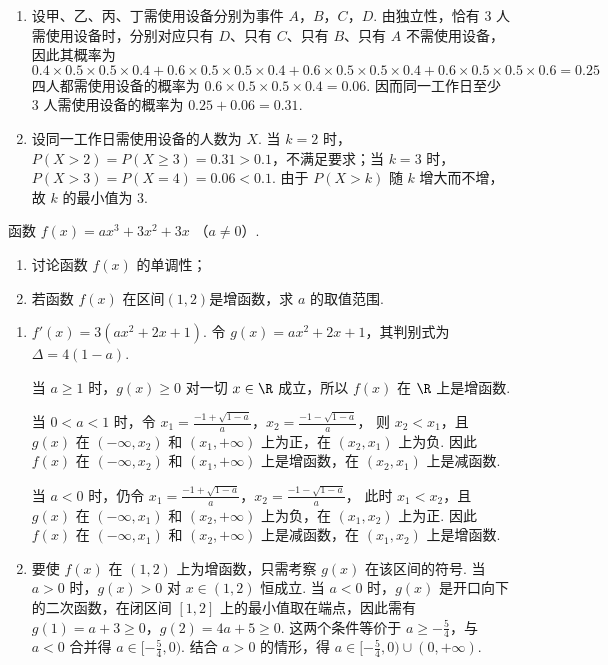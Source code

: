 \begin{solution}
\begin{enumerate}
\item 设甲、乙、丙、丁需使用设备分别为事件 \(A\)，\(B\)，\(C\)，\(D\). 由独立性，恰有 \(3\) 人需使用设备时，分别对应只有 \(D\)、只有 \(C\)、只有 \(B\)、只有 \(A\) 不需使用设备，因此其概率为
\[
0.4\times0.5\times0.5\times0.4
+0.6\times0.5\times0.5\times0.4
+0.6\times0.5\times0.5\times0.4
+0.6\times0.5\times0.5\times0.6
=0.25
\]
四人都需使用设备的概率为
\(0.6\times0.5\times0.5\times0.4=0.06\). 因而同一工作日至少 \(3\) 人需使用设备的概率为 \(0.25+0.06=0.31\).
\item 设同一工作日需使用设备的人数为 \(X\). 当 \(k=2\) 时，
\(P(X>2)=P(X\geqslant3)=0.31>0.1\)，不满足要求；当 \(k=3\) 时，
\(P(X>3)=P(X=4)=0.06<0.1\). 由于 \(P(X>k)\) 随 \(k\) 增大而不增，故 \(k\) 的最小值为 \(3\).
\end{enumerate}
\end{solution}

\begin{problem}
函数 \( f(x) = ax^3 + 3x^2 + 3x \) （\( a \neq 0 \)）.

\begin{enumerate}
\item 讨论函数 \( f(x) \) 的单调性；
\item 若函数 \( f(x) \) 在区间\((1,2)\)是增函数，求 \( a \) 的取值范围.
\end{enumerate}
\end{problem}

\begin{solution}
\begin{enumerate}
\item \(f'(x)=3(ax^2+2x+1)\). 令 \(g(x)=ax^2+2x+1\)，其判别式为
\(\Delta=4(1-a)\).

当 \(a\geqslant1\) 时，\(g(x)\geqslant0\) 对一切 \(x\in\R\) 成立，所以 \(f(x)\) 在 \(\R\) 上是增函数.

当 \(0<a<1\) 时，令
\(x_1=\frac{-1+\sqrt{1-a}}{a}\)，\(x_2=\frac{-1-\sqrt{1-a}}{a}\)，
则 \(x_2<x_1\)，且 \(g(x)\) 在 \((-\infty,x_2)\) 和 \((x_1,+\infty)\) 上为正，在 \((x_2,x_1)\) 上为负. 因此 \(f(x)\) 在 \((-\infty,x_2)\) 和 \((x_1,+\infty)\) 上是增函数，在 \((x_2,x_1)\) 上是减函数.

当 \(a<0\) 时，仍令
\(x_1=\frac{-1+\sqrt{1-a}}{a}\)，\(x_2=\frac{-1-\sqrt{1-a}}{a}\)，
此时 \(x_1<x_2\)，且 \(g(x)\) 在 \((-\infty,x_1)\) 和 \((x_2,+\infty)\) 上为负，在 \((x_1,x_2)\) 上为正. 因此 \(f(x)\) 在 \((-\infty,x_1)\) 和 \((x_2,+\infty)\) 上是减函数，在 \((x_1,x_2)\) 上是增函数.
\item 要使 \(f(x)\) 在 \((1,2)\) 上为增函数，只需考察 \(g(x)\) 在该区间的符号. 当 \(a>0\) 时，\(g(x)>0\) 对 \(x\in(1,2)\) 恒成立. 当 \(a<0\) 时，\(g(x)\) 是开口向下的二次函数，在闭区间 \([1,2]\) 上的最小值取在端点，因此需有
\(g(1)=a+3\geqslant0\)，\(g(2)=4a+5\geqslant0\). 这两个条件等价于 \(a\geqslant-\frac54\)，与 \(a<0\) 合并得 \(a\in[-\frac54,0)\). 结合 \(a>0\) 的情形，得
\(a\in[-\frac54,0)\cup(0,+\infty)\).
\end{enumerate}
\end{solution}

